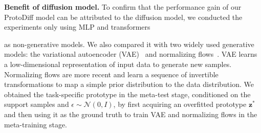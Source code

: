 \textbf{Benefit of diffusion model.}
To confirm that the performance gain of our ProtoDiff model can be attributed to the diffusion model, we conducted the experiments only using MLP and transformers
\begin{table}
\vspace{-3mm}
\caption{\textbf{Benefit of diffusion model} over 
(non-)generative models on  \textit{mini}Imagenet.}
\vspace{-1mm}
\centering
{}
\vspace{-3mm}
\label{tab:ab_diff}
\end{table}
as non-generative models. We also compared it with two widely used generative models: the variational autoencoder (VAE)~\cite{kingma2013auto} and normalizing flows~\cite{rezende2015variational}. VAE learns a low-dimensional 
representation of input data to generate new samples. Normalizing flows are more recent and learn a sequence of invertible transformations to map a simple prior distribution to the data distribution.
We obtained the task-specific prototype in the meta-test stage, conditioned on the support samples and $\epsilon \sim \mathcal{N}(0, I)$, by first acquiring an overfitted prototype $\mathbf{z}^*$ and then using it as the ground truth to train VAE and normalizing flows in the meta-training stage.
